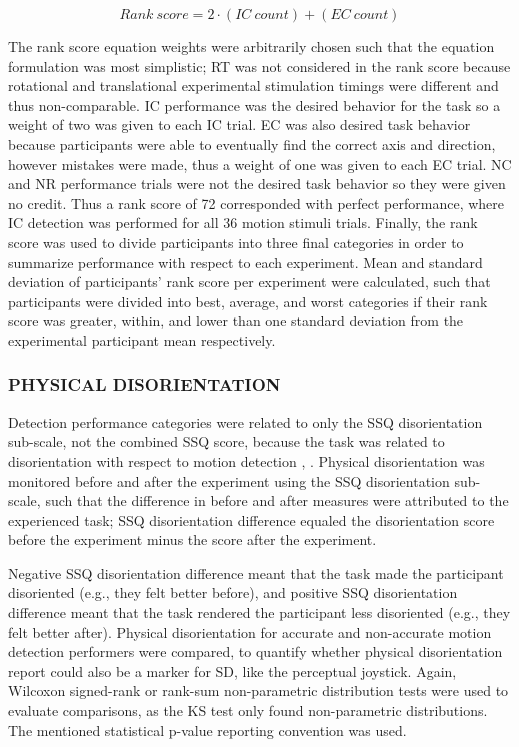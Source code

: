 \documentclass{ieeeaccess}
\begin{document}
\begin{equation}
Rank~score = 2 \cdot (IC~count) + (EC~count)
\label{eqn_rank_score}
\end{equation}

The rank score equation weights were arbitrarily chosen such that the equation formulation was most simplistic; RT was not considered in the rank score because rotational and translational experimental stimulation timings were different and thus non-comparable. IC performance was the desired behavior for the task so a weight of two was given to each IC trial. EC was also desired task behavior because participants were able to eventually find the correct axis and direction, however mistakes were made, thus a weight of one was given to each EC trial. NC and NR performance trials were not the desired task behavior so they were given no credit. Thus a rank score of 72 corresponded with perfect performance, where IC detection was performed for all 36 motion stimuli trials. Finally, the rank score was used to divide participants into three final categories in order to summarize performance with respect to each experiment. Mean and standard deviation of participants' rank score per experiment were calculated, such that participants were divided into best, average, and worst categories if their rank score was greater, within, and lower than one standard deviation from the experimental participant mean respectively.

\subsubsection{PHYSICAL DISORIENTATION}
Detection performance categories were related to only the SSQ disorientation sub-scale, not the combined SSQ score, because the task was related to disorientation with respect to motion detection \cite{Kennedy_1993_Simulator}, \cite{Bouchard_2007_SimulatorSickness}. Physical disorientation was monitored before and after the experiment using the SSQ disorientation sub-scale, such that the difference in before and after measures were attributed to the experienced task; SSQ disorientation difference equaled the disorientation score before the experiment minus the score after the experiment.

Negative SSQ disorientation difference meant that the task made the participant disoriented (e.g., they felt better before), and positive SSQ disorientation difference meant that the task rendered the participant less disoriented (e.g., they felt better after). Physical disorientation for accurate and non-accurate motion detection performers were compared, to quantify whether physical disorientation report could also be a marker for SD, like the perceptual joystick. Again, Wilcoxon signed-rank or rank-sum non-parametric distribution tests were used to evaluate comparisons, as the KS test only found non-parametric distributions. The mentioned statistical p-value reporting convention was used.
\end{document}
